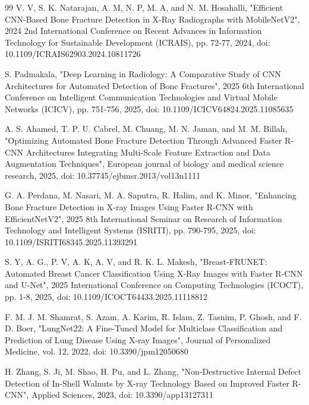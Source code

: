 \documentclass[conference]{IEEEtran}
\begin{document}
\begin{thebibliography}{99}
 V. V, S. K. Natarajan, A. M, N. P, M. A, and N. M. Hosahalli, "Efficient CNN-Based Bone Fracture Detection in X-Ray Radiographs with MobileNetV2", 2024 2nd International Conference on Recent Advances in Information Technology for Sustainable Development (ICRAIS), pp. 72-77, 2024, doi: 10.1109/ICRAIS62903.2024.10811726

 S. Padmakala, "Deep Learning in Radiology: A Comparative Study of CNN Architectures for Automated Detection of Bone Fractures", 2025 6th International Conference on Intelligent Communication Technologies and Virtual Mobile Networks (ICICV), pp. 751-756, 2025, doi: 10.1109/ICICV64824.2025.11085635

 A. S. Ahamed, T. P. U. Cabrel, M. Chuang, M. N. Jaman, and M. M. Billah, "Optimizing Automated Bone Fracture Detection Through Advanced Faster R-CNN Architectures Integrating Multi-Scale Feature Extraction and Data Augmentation Techniques", European journal of biology and medical science research, 2025, doi: 10.37745/ejbmsr.2013/vol13n1111

 G. A. Perdana, M. Nasari, M. A. Saputra, R. Halim, and K. Minor, "Enhancing Bone Fracture Detection in X-ray Images Using Faster R-CNN with EfficientNetV2", 2025 8th International Seminar on Research of Information Technology and Intelligent Systems (ISRITI), pp. 790-795, 2025, doi: 10.1109/ISRITI68345.2025.11393291

 S. Y, A. G., P. V, A. K, A. V, and R. K. L. Makesh, "Breast-FRUNET: Automated Breast Cancer Classification Using X-Ray Images with Faster R-CNN and U-Net", 2025 International Conference on Computing Technologies (ICOCT), pp. 1-8, 2025, doi: 10.1109/ICOCT64433.2025.11118812

 F. M. J. M. Shamrat, S. Azam, A. Karim, R. Islam, Z. Tasnim, P. Ghosh, and F. D. Boer, "LungNet22: A Fine-Tuned Model for Multiclass Classification and Prediction of Lung Disease Using X-ray Images", Journal of Personalized Medicine, vol. 12, 2022, doi: 10.3390/jpm12050680

 H. Zhang, S. Ji, M. Shao, H. Pu, and L. Zhang, "Non-Destructive Internal Defect Detection of In-Shell Walnuts by X-ray Technology Based on Improved Faster R-CNN", Applied Sciences, 2023, doi: 10.3390/app13127311

\end{thebibliography}
\end{document}

